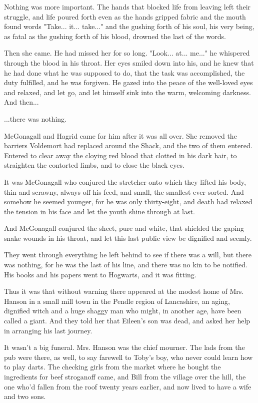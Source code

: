 Nothing was more important. The hands that blocked life from leaving left their struggle, and life poured forth even as the hands gripped fabric and the mouth found words "Take... it... take..." and the gushing forth of his soul, his very being, as fatal as the gushing forth of his blood, drowned the last of the words.

Then she came. He had missed her for so long. "Look... at... me..." he whispered through the blood in his throat. Her eyes smiled down into his, and he knew that he had done what he was supposed to do, that the task was accomplished, the duty fulfilled, and he was forgiven. He gazed into the peace of the well-loved eyes and relaxed, and let go, and let himself sink into the warm, welcoming darkness. And then...

...there was nothing.

\sbreak

McGonagall and Hagrid came for him after it was all over. She removed the barriers Voldemort had replaced around the Shack, and the two of them entered. Entered to clear away the cloying red blood that clotted in his dark hair, to straighten the contorted limbs, and to close the black eyes.

It was McGonagall who conjured the stretcher onto which they lifted his body, thin and scrawny, always off his feed, and small, the smallest ever sorted. And somehow he seemed younger, for he was only thirty-eight, and death had relaxed the tension in his face and let the youth shine through at last.

And McGonagall conjured the sheet, pure and white, that shielded the gaping snake wounds in his throat, and let this last public view be dignified and seemly.

They went through everything he left behind to see if there was a will, but there was nothing, for he was the last of his line, and there was no kin to be notified. His books and his papers went to Hogwarts, and it was fitting.

Thus it was that without warning there appeared at the modest home of Mrs. Hanson in a small mill town in the Pendle region of Lancashire, an aging, dignified witch and a huge shaggy man who might, in another age, have been called a giant. And they told her that Eileen's son was dead, and asked her help in arranging his last journey.

It wasn't a big funeral. Mrs. Hanson was the chief mourner. The lads from the pub were there, as well, to say farewell to Toby's boy, who never could learn how to play darts. The checking girls from the market where he bought the ingredients for beef stroganoff came, and Bill from the village over the hill, the one who'd fallen from the roof twenty years earlier, and now lived to have a wife and two sons.

